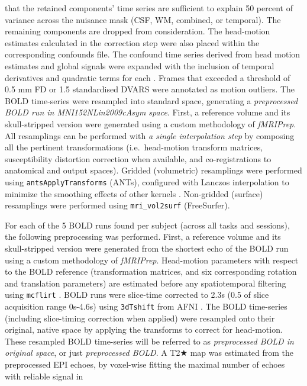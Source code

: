 \documentclass[
]{article}
\begin{document}
\begin{description}
that the retained components' time series are sufficient to explain 50
percent of variance across the nuisance mask (CSF, WM, combined, or
temporal). The remaining components are dropped from consideration. The
head-motion estimates calculated in the correction step were also placed
within the corresponding confounds file. The confound time series
derived from head motion estimates and global signals were expanded with
the inclusion of temporal derivatives and quadratic terms for each
\citep{confounds_satterthwaite_2013}. Frames that exceeded a threshold
of 0.5 mm FD or 1.5 standardised DVARS were annotated as motion
outliers. The BOLD time-series were resampled into standard space,
generating a \emph{preprocessed BOLD run in MNI152NLin2009cAsym space}.
First, a reference volume and its skull-stripped version were generated
using a custom methodology of \emph{fMRIPrep}. All resamplings can be
performed with \emph{a single interpolation step} by composing all the
pertinent transformations (i.e.~head-motion transform matrices,
susceptibility distortion correction when available, and
co-registrations to anatomical and output spaces). Gridded (volumetric)
resamplings were performed using \texttt{antsApplyTransforms} (ANTs),
configured with Lanczos interpolation to minimize the smoothing effects
of other kernels \citep{lanczos}. Non-gridded (surface) resamplings were
performed using \texttt{mri\_vol2surf} (FreeSurfer).
\item[Functional data preprocessing]
For each of the 5 BOLD runs found per subject (across all tasks and
sessions), the following preprocessing was performed. First, a reference
volume and its skull-stripped version were generated from the shortest
echo of the BOLD run using a custom methodology of \emph{fMRIPrep}.
Head-motion parameters with respect to the BOLD reference
(transformation matrices, and six corresponding rotation and translation
parameters) are estimated before any spatiotemporal filtering using
\texttt{mcflirt} \citep[FSL 6.0.5.1:57b01774,][]{mcflirt}. BOLD runs
were slice-time corrected to 2.3s (0.5 of slice acquisition range
0s-4.6s) using \texttt{3dTshift} from AFNI
\citep[RRID:SCR\_005927]{afni}. The BOLD time-series (including
slice-timing correction when applied) were resampled onto their
original, native space by applying the transforms to correct for
head-motion. These resampled BOLD time-series will be referred to as
\emph{preprocessed BOLD in original space}, or just \emph{preprocessed
BOLD}. A T2★ map was estimated from the preprocessed EPI echoes, by
voxel-wise fitting the maximal number of echoes with reliable signal in

\end{description}
\end{document}
